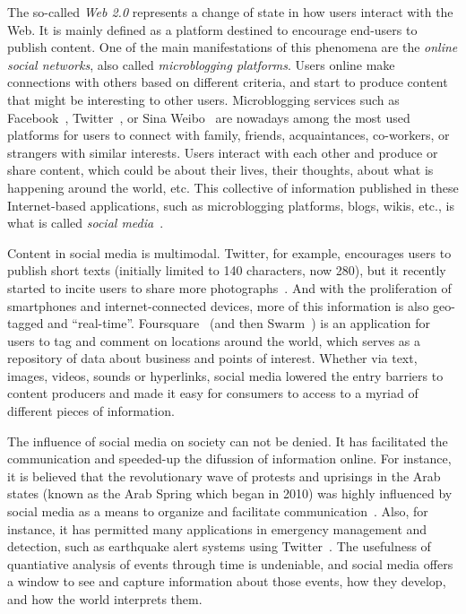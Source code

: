\begin{intro}


The so-called {\em Web 2.0} represents a change of state in how users interact
with the Web.
%
It is mainly defined as a platform destined to encourage end-users to
publish content. 
%
One of the main manifestations of this phenomena are the {\em online social
networks}, also called {\em microblogging platforms}.
%
Users online make connections with others based on different criteria, and start
to produce content that might be interesting to other users. 
%
Microblogging services such as Facebook~\cite{facebook}, Twitter~\cite{twitter},
or Sina Weibo~\cite{weibo} are nowadays among the most used platforms for users
to connect with family, friends, acquaintances, co-workers, or strangers with
similar interests.   
%
Users interact with each other and produce or share content, which could be
about their lives, their thoughts, about what is happening around the world,
etc.    
%
This collective of information published in these Internet-based applications,
such as microblogging platforms, blogs, wikis, etc., is what is called {\em
social media}~\cite{kaplan2010users}.



Content in social media is multimodal. 
%
Twitter, for example, encourages users to publish short texts (initially limited
to 140 characters, now 280), but it recently started to incite users to share
more photographs~\cite{brown_2019}.
%  
And with the proliferation of smartphones and internet-connected devices, more
of this information is also geo-tagged and ``real-time''. 
%
Foursquare~\cite{foursquare} (and then
Swarm~\cite{swarm}) is an application for users to tag
and comment on locations around the world, which serves as a repository of data
about business and points of interest.
%
Whether via text, images, videos, sounds or hyperlinks, social media lowered the
entry barriers to content producers and made it easy for consumers to access to
a myriad of different pieces of information.





The influence of social media on society can not be denied. 
% 
It has facilitated the communication and speeded-up the difussion of information
online. 
%
For instance, it is believed that the revolutionary wave of protests and
uprisings in the Arab states (known as the Arab Spring which began in 2010) was
highly influenced by social media as a means to organize and facilitate
communication~\cite{howard2011opening}. 
%
Also, for instance, it has permitted many applications in emergency management
and detection, such as earthquake alert systems using
Twitter~\cite{Sakaki2010,Sarmiento:2018:DDE:3201064.3201077,Mendoza2019}.
%
The usefulness of quantiative analysis of events through time is undeniable, and
social media offers a window to see and capture information about those events,
how they develop, and how the world interprets them.




\end{intro}
